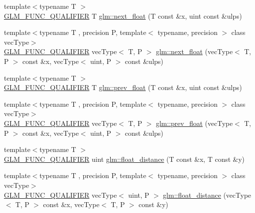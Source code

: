 \begin{DoxyCompactItemize}
\item 
{\footnotesize template$<$typename T $>$ }\\\hyperlink{setup_8hpp_a33fdea6f91c5f834105f7415e2a64407}{G\+L\+M\+\_\+\+F\+U\+N\+C\+\_\+\+Q\+U\+A\+L\+I\+F\+I\+ER} T \hyperlink{namespaceglm_ae4ffae05b7502be722f522c04f7e42ac}{glm\+::next\+\_\+float} (T const \&x, uint const \&ulps)
\item 
{\footnotesize template$<$typename T , precision P, template$<$ typename, precision $>$ class vec\+Type$>$ }\\\hyperlink{setup_8hpp_a33fdea6f91c5f834105f7415e2a64407}{G\+L\+M\+\_\+\+F\+U\+N\+C\+\_\+\+Q\+U\+A\+L\+I\+F\+I\+ER} vec\+Type$<$ T, P $>$ \hyperlink{namespaceglm_a3ad10c60be0fa0e754c8064ca13c4b91}{glm\+::next\+\_\+float} (vec\+Type$<$ T, P $>$ const \&x, vec\+Type$<$ uint, P $>$ const \&ulps)
\item 
{\footnotesize template$<$typename T $>$ }\\\hyperlink{setup_8hpp_a33fdea6f91c5f834105f7415e2a64407}{G\+L\+M\+\_\+\+F\+U\+N\+C\+\_\+\+Q\+U\+A\+L\+I\+F\+I\+ER} T \hyperlink{namespaceglm_a87ac8f75510274e112fe8512cfaa6935}{glm\+::prev\+\_\+float} (T const \&x, uint const \&ulps)
\item 
{\footnotesize template$<$typename T , precision P, template$<$ typename, precision $>$ class vec\+Type$>$ }\\\hyperlink{setup_8hpp_a33fdea6f91c5f834105f7415e2a64407}{G\+L\+M\+\_\+\+F\+U\+N\+C\+\_\+\+Q\+U\+A\+L\+I\+F\+I\+ER} vec\+Type$<$ T, P $>$ \hyperlink{namespaceglm_a742d4d85c23906178d1fd0c9fbab266c}{glm\+::prev\+\_\+float} (vec\+Type$<$ T, P $>$ const \&x, vec\+Type$<$ uint, P $>$ const \&ulps)
\item 
{\footnotesize template$<$typename T $>$ }\\\hyperlink{setup_8hpp_a33fdea6f91c5f834105f7415e2a64407}{G\+L\+M\+\_\+\+F\+U\+N\+C\+\_\+\+Q\+U\+A\+L\+I\+F\+I\+ER} uint \hyperlink{group__gtc__ulp_ga2e09bd6c8b0a9c91f6f5683d68245634}{glm\+::float\+\_\+distance} (T const \&x, T const \&y)
\item 
{\footnotesize template$<$typename T , precision P, template$<$ typename, precision $>$ class vec\+Type$>$ }\\\hyperlink{setup_8hpp_a33fdea6f91c5f834105f7415e2a64407}{G\+L\+M\+\_\+\+F\+U\+N\+C\+\_\+\+Q\+U\+A\+L\+I\+F\+I\+ER} vec\+Type$<$ uint, P $>$ \hyperlink{namespaceglm_a2e00104097b2f3967e97131933595309}{glm\+::float\+\_\+distance} (vec\+Type$<$ T, P $>$ const \&x, vec\+Type$<$ T, P $>$ const \&y)
\end{DoxyCompactItemize}


